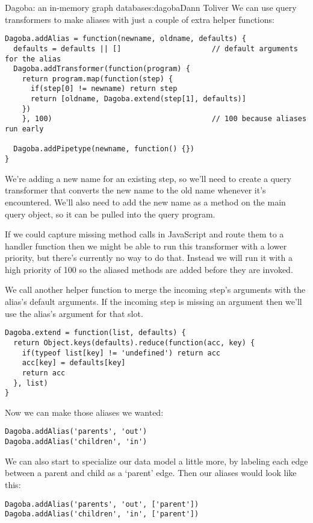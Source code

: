 \begin{aosachapter}{Dagoba: an in-memory graph database}{s:dagoba}{Dann Toliver}
We can use query transformers to make aliases with just a couple of
extra helper functions:

\begin{verbatim}
Dagoba.addAlias = function(newname, oldname, defaults) {
  defaults = defaults || []                     // default arguments for the alias
  Dagoba.addTransformer(function(program) {
    return program.map(function(step) {
      if(step[0] != newname) return step
      return [oldname, Dagoba.extend(step[1], defaults)]
    })
    }, 100)                                     // 100 because aliases run early

  Dagoba.addPipetype(newname, function() {})
}
\end{verbatim}

We're adding a new name for an existing step, so we'll need to create a
query transformer that converts the new name to the old name whenever
it's encountered. We'll also need to add the new name as a method on the
main query object, so it can be pulled into the query program.

If we could capture missing method calls in JavaScript and route them to
a handler function then we might be able to run this transformer with a
lower priority, but there's currently no way to do that. Instead we will
run it with a high priority of 100 so the aliased methods are added
before they are invoked.

We call another helper function to merge the incoming step's arguments
with the alias's default arguments. If the incoming step is missing an
argument then we'll use the alias's argument for that slot.

\begin{verbatim}
Dagoba.extend = function(list, defaults) {
  return Object.keys(defaults).reduce(function(acc, key) {
    if(typeof list[key] != 'undefined') return acc
    acc[key] = defaults[key]
    return acc
  }, list)
}
\end{verbatim}

Now we can make those aliases we wanted:

\begin{verbatim}
Dagoba.addAlias('parents', 'out')
Dagoba.addAlias('children', 'in')
\end{verbatim}

We can also start to specialize our data model a little more, by
labeling each edge between a parent and child as a `parent' edge. Then
our aliases would look like this:

\begin{verbatim}
Dagoba.addAlias('parents', 'out', ['parent'])
Dagoba.addAlias('children', 'in', ['parent'])
\end{verbatim}


\end{aosachapter}

